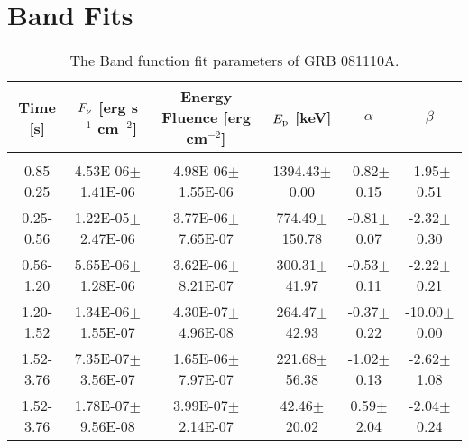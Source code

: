 



\section{Band Fits}

\begin{table}[h]
\centering
\scriptsize
\label{tab:}
\begin{tabular}{c| c c c c c}
Time [s] & $F_{\nu}$ [erg s$^{-1}$ cm$^{-2}$] & Energy Fluence [erg cm$^{-2}$] & $E_{\rm p}$ [keV] & $\alpha$ & $\beta$ \\
\hline \hline\\ 

-0.85-0.25 & 4.53E-06$\pm$1.41E-06 & 4.98E-06$\pm$1.55E-06 & 1394.43$\pm$0.00 & -0.82$\pm$0.15 & -1.95$\pm$0.51 \\ 

0.25-0.56 & 1.22E-05$\pm$2.47E-06 & 3.77E-06$\pm$7.65E-07 & 774.49$\pm$150.78 & -0.81$\pm$0.07 & -2.32$\pm$0.30 \\ 

0.56-1.20 & 5.65E-06$\pm$1.28E-06 & 3.62E-06$\pm$8.21E-07 & 300.31$\pm$41.97 & -0.53$\pm$0.11 & -2.22$\pm$0.21 \\ 

1.20-1.52 & 1.34E-06$\pm$1.55E-07 & 4.30E-07$\pm$4.96E-08 & 264.47$\pm$42.93 & -0.37$\pm$0.22 & -10.00$\pm$0.00 \\ 

1.52-3.76 & 7.35E-07$\pm$3.56E-07 & 1.65E-06$\pm$7.97E-07 & 221.68$\pm$56.38 & -1.02$\pm$0.13 & -2.62$\pm$1.08 \\ 

1.52-3.76 & 1.78E-07$\pm$9.56E-08 & 3.99E-07$\pm$2.14E-07 & 42.46$\pm$20.02 & 0.59$\pm$2.04 & -2.04$\pm$0.24 \\ 

\end{tabular}
\caption{The Band function fit parameters of GRB 081110A.}
\end{table}


